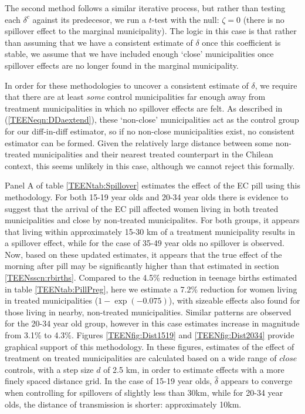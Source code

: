 The second method follows a similar iterative process, but rather than testing
each $\delta^c$ against its predecesor, we run a $t$-test with the null:
$\zeta=0$ (there is no spillover effect to the marginal municipality).  The logic
 in this case is that rather than assuming that we have a consistent estimate of 
$\delta$ once this coefficient is stable, we assume that we have included enough 
`close' municipalities once spillover effects are no longer found in the marginal 
municipality.

In order for these methodologies to uncover a consistent estimate of $\delta$,
we require that there are at least \emph{some} control municipalities far enough 
away from treatment municipalities in which no spillover effects are felt.  As 
described in (\ref{TEENeqn:DDaextend}), these `non-close' municipalities act as 
the control group for our diff-in-diff estimator, so if no non-close municipalities 
exist, no consistent estimator can be formed.  Given the relatively large distance 
between some non-treated municipalities and their nearest treated counterpart in 
the Chilean context, this seems unlikely in this case, although we cannot reject 
this formally.

Panel A of table \ref{TEENtab:Spillover} estimates the effect of the EC pill 
using this methodology. For both 15-19 year olds and 20-34 year olds there is
evidence to suggest that the arrival of the EC pill affected women living in both
treated municipalities and close by non-treated municipalites. For both groups,
it appears that living within approximately 15-30 km of a treatment municipality 
results in a spillover effect, while for the case of 35-49 year olds no spillover
is observed.  Now, based on these updated estimates, it appears that the true 
effect of the morning after pill may be significantly higher than that estimated 
in section \ref{TEENsscn:rbirths}.  Compared to the 4.5\% reduction in teenage 
births estimated in table \ref{TEENtab:PillPreg}, here we estimate a 7.2\% 
reduction for women living in treated municipalities ($1-\exp(-0.075)$), with 
sizeable effects also found for those living in nearby, non-treated 
municipalities.  Similar patterns are observed for the 20-34 year old group,
however in this case estimates increase in magnitude from 3.1\% to 4.3\%.
Figures \ref{TEENfig:Dist1519} and \ref{TEENfig:Dist2034} provide graphical
support of this methodology.  In these figures, estimates of the effect of 
treatment on treated municipalities are calculated based on 
a wide range of $close$ controls, with a step size $d$ of 2.5 km, in order to 
estimate effects with a more finely spaced distance grid.  In the case of 15-19 
year olds, $\hat\delta$ appears to converge when controlling for spillovers of 
slightly less than 30km, while for 20-34 year olds, the distance of transmission 
is shorter: approximately 10km.

